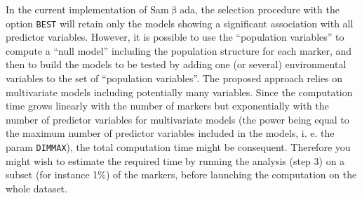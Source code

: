 \documentclass[a4paper,11pt]{article}
\newcommand{\smb}{\textsf{Sam$\upbeta$ada}}
\newcommand{\prog}[1]{\texttt{#1}}
\begin{document}
In the current implementation of \smb, the selection procedure with the option \prog{BEST} will retain only the models showing a significant association with all predictor variables.
However, it is possible to use the \enquote{population variables} to compute a \enquote{null model} including the population structure for each marker, and then to build the models to be tested by adding one (or several) environmental variables to the set of \enquote{population variables}.
The proposed approach relies on multivariate models including potentially many variables.
Since the computation time grows linearly with the number of markers but exponentially with the number of predictor variables for multivariate models (the power being equal to the maximum number of predictor variables included in the models, i. e. the param \texttt{DIMMAX}), the total computation time might be consequent.
Therefore you might wish to estimate the required time by running the analysis (step 3) on a subset (for instance 1\%) of the markers, before launching the computation on the whole dataset.
\end{document}
